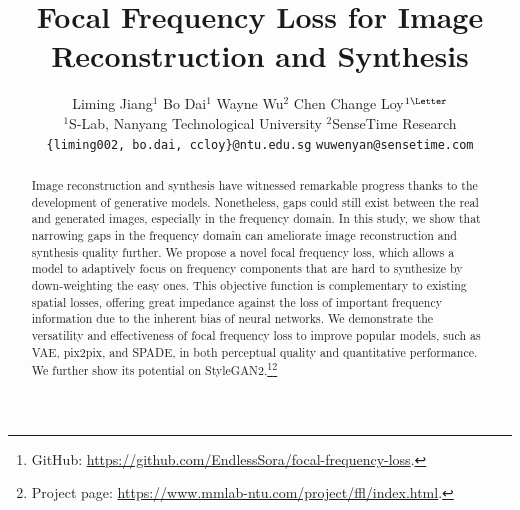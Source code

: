\documentclass[10pt,twocolumn,letterpaper]{article}
\begin{document}
\title{\vspace{-0.1cm}Focal Frequency Loss for Image Reconstruction and Synthesis\vspace{-0.282cm}}

\author{Liming Jiang$^{1}$ \hspace{12pt} Bo Dai$^{1}$ \hspace{12pt} Wayne Wu$^{2}$ \hspace{12pt} Chen Change Loy$^{1\textrm{\Letter}}$\\[2pt]
$^1$S-Lab, Nanyang Technological University \hspace{12pt} $^2$SenseTime Research\\[1pt]
{\tt\small \{liming002, bo.dai, ccloy\}@ntu.edu.sg} \hspace{12pt}
{\tt\small wuwenyan@sensetime.com}\vspace{-0.15cm}
}

\maketitle





\begin{abstract}
\label{sec:abstract}

Image reconstruction and synthesis have witnessed remarkable progress thanks to the development of generative models.
Nonetheless, gaps could still exist between the real and generated images, especially in the frequency domain.
In this study, we show that narrowing gaps in the frequency domain can ameliorate image reconstruction and synthesis quality further.
We propose a novel focal frequency loss, which allows a model to adaptively focus on frequency components that are hard to synthesize by down-weighting the easy ones.
This objective function is complementary to existing spatial losses, offering great impedance against the loss of important frequency information due to the inherent bias of neural networks.
We demonstrate the versatility and effectiveness of focal frequency loss to improve popular models, such as VAE, pix2pix, and SPADE, in both perceptual quality and quantitative performance. We further show its potential on StyleGAN2.\footnote{\hspace{0.07cm}GitHub: \href{https://github.com/EndlessSora/focal-frequency-loss}{https://github.com/EndlessSora/focal-frequency-loss}.}\footnote{\hspace{0.07cm}Project page: \href{https://www.mmlab-ntu.com/project/ffl/index.html}{https://www.mmlab-ntu.com/project/ffl/index.html}.}


\end{abstract} 
\end{document}
